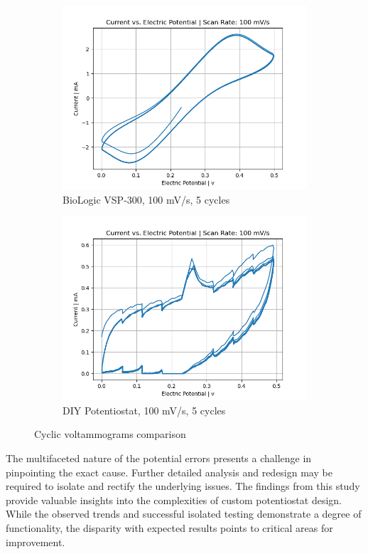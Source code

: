\documentclass{article}
\begin{document}
\begin{figure}[H]
    \begin{subfigure}[b]{0.45\textwidth}
    \includegraphics[width=\textwidth]{FECN_100mVs_5cycles_lab.png}
    \caption{BioLogic VSP-300, 100 mV/s, 5 cycles}
    \end{subfigure}
    \hfill
    \begin{subfigure}[b]{0.45\textwidth}
    \includegraphics[width=\textwidth]{FECN_100mVs_5cycles.png}
    \caption{DIY Potentiostat, 100 mV/s, 5 cycles}
    \end{subfigure}
    \caption{Cyclic voltammograms comparison}
    \end{figure}

The multifaceted nature of the potential errors presents a challenge in pinpointing the exact cause. Further detailed analysis and redesign may be required to isolate and rectify the underlying issues. The findings from this study provide valuable insights into the complexities of custom potentiostat design. While the observed trends and successful isolated testing demonstrate a degree of functionality, the disparity with expected results points to critical areas for improvement.
\end{document}

